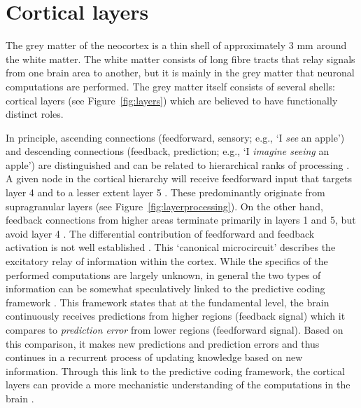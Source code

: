 \section*{Cortical layers}
The grey matter of the neocortex is a thin shell of approximately 3 mm \cite{Zilles1990} around the white matter. The white matter consists of long fibre tracts that relay signals from one brain area to another, but it is mainly in the grey matter that neuronal computations are performed. The grey matter itself consists of several shells: cortical layers (see Figure~\ref{fig:layers}) which are believed to have functionally distinct roles.

In principle, ascending connections (feedforward, sensory; e.g., `I \emph{see} an apple') and descending connections (feedback, prediction; e.g., `I \emph{imagine seeing} an apple') are distinguished \cite{Rockland1979} and can be related to hierarchical ranks of processing \cite{Barone2000}. A given node in the cortical hierarchy will receive feedforward input that targets layer 4 and to a lesser extent layer 5 \cite{Constantinople2013}. These predominantly originate from supragranular layers (see Figure~\ref{fig:layerprocessing}). On the other hand, feedback connections from higher areas terminate primarily in layers 1 and 5, but avoid layer 4 \cite{Anderson2009}. The differential contribution of feedforward and feedback activation is not well established \cite{Shipp2013}. This `canonical microcircuit' describes the excitatory relay of information within the cortex. While the specifics of the performed computations are largely unknown, in general the two types of information can be somewhat speculatively linked to the predictive coding framework \cite{Friston2010}. This framework states that at the fundamental level, the brain continuously receives predictions from higher regions (feedback signal) which it compares to \emph{prediction error} from lower regions (feedforward signal). Based on this comparison, it makes new predictions and prediction errors and thus continues in a recurrent process of updating knowledge based on new information. Through this link to the predictive coding framework, the cortical layers can provide a more mechanistic understanding of the computations in the brain \cite{Shipp2016}.


